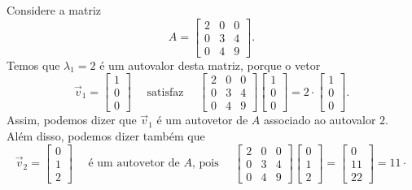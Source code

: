 \begin{ex}
	Considere a matriz
	\begin{equation}
	A={
	\begin{bmatrix}
	2 & 0 & 0 \\
	0 & 3 & 4 \\
	0 & 4 & 9
	\end{bmatrix}}.
	\end{equation} Temos que $\lambda_1 = 2$ é um autovalor desta matriz, porque o vetor
	\begin{equation}
	\vec{v}_1 =
	{
	\begin{bmatrix}
	1 \\
	0 \\
	0
	\end{bmatrix}} \quad \text{ satisfaz } \quad {
	\begin{bmatrix}
	2 & 0 & 0 \\
	0 & 3 & 4 \\
	0 & 4 & 9
	\end{bmatrix}} {
	\begin{bmatrix}
	1 \\
	0 \\
	0
	\end{bmatrix}} = 2 \cdot {
	\begin{bmatrix}
	1 \\
	0 \\
	0
	\end{bmatrix}}.
	\end{equation} Assim, podemos dizer que $\vec{v}_1$ é um autovetor de $A$ associado ao autovalor $2$. Além disso, podemos dizer também que
	\begin{equation}
	\vec{v}_2 =
	{\begin{bmatrix}
	0 \\
	1 \\
	2
	\end{bmatrix}} \quad \text{ é um autovetor de $A$, pois } \quad {
	\begin{bmatrix}
	2 & 0 & 0 \\
	0 & 3 & 4 \\
	0 & 4 & 9 
	\end{bmatrix}} {
	\begin{bmatrix}
	0 \\
	1 \\
	2
	\end{bmatrix}} = {
	\begin{bmatrix}
	0 \\
	11 \\
	22
	\end{bmatrix}} = 11 \cdot {
}
\end{equation}
\end{ex}
